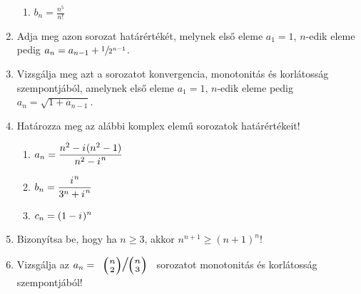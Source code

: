 \documentclass[a4paper, 12pt]{scrartcl}
\begin{document}
\begin{enumerate}
\begin{enumerate}
          \item $\displaystyle
                  b_n = \frac{n^5}{n!}
                $
        \end{enumerate}

  \item Adja meg azon sorozat határértékét, melynek első eleme $a_1 = 1$,
        $n$-edik eleme pedig $a_n = a_{n - 1} + \sfrac{1}{2^{n - 1}}$.

  \item Vizsgálja meg azt a sorozatot konvergencia, monotonitás és korlátosság
        szempontjából, amelynek első eleme $a_1 = 1$, $n$-edik eleme pedig
        $a_n = \sqrt{1 + a_{n - 1}}$.

  \item Határozza meg az alábbi komplex elemű sorozatok határértékeit!
        \begin{enumerate}
          \item $\displaystyle
                  a_n = \frac{n^2 - {i\mkern1mu}(n^2 - 1)}{n^2 - {i\mkern1mu}^n}
                $

          \item $\displaystyle
                  b_n = \frac{{i\mkern1mu}^n}{3^n + {i\mkern1mu}^n}
                $

          \item $\displaystyle
                  c_n = (1 - {i\mkern1mu})^n
                $
        \end{enumerate}

  \item Bizonyítsa be, hogy ha $n \geq 3$, akkor $n^{n + 1} \geq (n + 1)^n$!

  \item Vizsgálja az $a_n = \scalebox{1.5}{
        $\sfrac{\binom{n}{2}}{\binom{n}{3}}$
          }$ sorozatot monotonitás és korlátosság szempontjából!
\end{enumerate}

\end{document}
